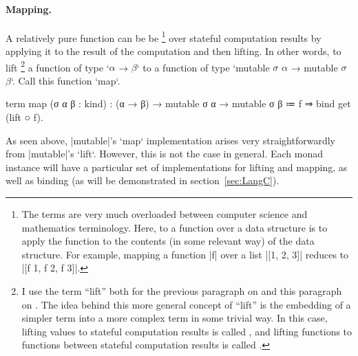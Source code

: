 \paragraph{Mapping.}
A relatively pure function can be be %
\footnote{
  The terms  are very much overloaded between computer science and mathematics terminology.
  Here, to  a function over a data structure is to apply the function to the contents (in some relevant way) of the data structure.
  For example, mapping a function \code|f| over a list \code|[1, 2, 3]| reduces to \code|[f 1, f 2, f 3]|.
}
over stateful computation results by applying it to the result of the computation and then lifting.
In other words, to lift%
\footnote{
  I use the term ``lift'' both for the previous paragraph on  and this paragraph on .
  The idea behind this more general concept of ``lift'' is the embedding of a simpler term into a more complex term in some trivial way.
  In this case,
  lifting values to stateful computation results is called , and
  lifting functions to functions between stateful computation results is called .
}
a function of type \code`$α$ → $β$` to a function of type \code`mutable $σ$ $α$ → mutable $σ$ $β$`.
Call this function \code`map`.
\begin{program}
term map (σ α β : kind) : (α → β) → mutable σ α → mutable σ β
  ≔ f ⇒ bind get (lift ○ f).
\end{program}
As seen above, \code|mutable|'s \code`map` implementation  arises very straightforwardly from \code|mutable|'s \code`lift`.
However, this is not the case in general.
Each monad instance will have a particular set of implementations for lifting and mapping, as well as binding (as will be demonstrated in section~\ref{sec:LangC}).

